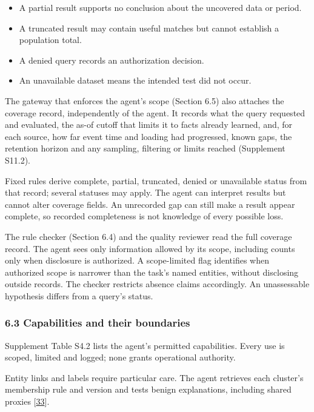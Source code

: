 \documentclass[
  11pt,
]{article}
\providecommand{\tightlist}{%
  \setlength{\itemsep}{0pt}\setlength{\parskip}{0pt}}
\renewcommand{\tightlist}{\setlength{\itemsep}{0pt plus 1pt}\setlength{\parskip}{0pt}}
\begin{document}
\begin{itemize}
\tightlist
\item
  A partial result supports no conclusion about the uncovered data or
  period.
\item
  A truncated result may contain useful matches but cannot establish a
  population total.
\item
  A denied query records an authorization decision.
\item
  An unavailable dataset means the intended test did not occur.
\end{itemize}

The gateway that enforces the agent's scope (Section 6.5) also attaches
the coverage record, independently of the agent. It records what the
query requested and evaluated, the as-of cutoff that limits it to facts
already learned, and, for each source, how far event time and loading
had progressed, known gaps, the retention horizon and any sampling,
filtering or limits reached (Supplement S11.2).

Fixed rules derive complete, partial, truncated, denied or unavailable
status from that record; several statuses may apply. The agent can
interpret results but cannot alter coverage fields. An unrecorded gap
can still make a result appear complete, so recorded completeness is not
knowledge of every possible loss.

The rule checker (Section 6.4) and the quality reviewer read the full
coverage record. The agent sees only information allowed by its scope,
including counts only when disclosure is authorized. A scope-limited
flag identifies when authorized scope is narrower than the task's named
entities, without disclosing outside records. The checker restricts
absence claims accordingly. An unassessable hypothesis differs from a
query's status.

\hypertarget{capabilities-and-their-boundaries}{%
\subsubsection{6.3 Capabilities and their
boundaries}\label{capabilities-and-their-boundaries}}

Supplement Table S4.2 lists the agent's permitted capabilities. Every
use is scoped, limited and logged; none grants operational authority.

Entity links and labels require particular care. The agent retrieves
each cluster's membership rule and version and tests benign
explanations, including shared proxies
{[}\protect\hyperlink{ref-Liu2018GEM}{33}{]}.
\end{document}
